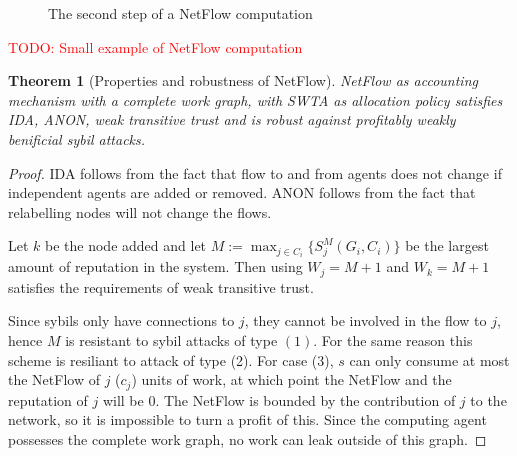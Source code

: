 \documentclass[a4paper,11pt]{book}
\newcommand\musthave[1]{\textcolor{red}{TODO: #1}}
\newtheorem{theorem}{Theorem}
\theoremstyle{definition}
\begin{document}
\begin{figure}[h]
    \centering
     \caption{The second step of a NetFlow computation}
     \label{fig:ex_nf_2}
\end{figure}


\musthave{Small example of NetFlow computation}


\begin{theorem}[Properties and robustness of NetFlow]
    NetFlow as accounting mechanism with a complete work graph, with SWTA as allocation policy
    satisfies IDA, ANON, weak transitive trust and is robust against
    profitably weakly benificial sybil attacks.

    \label{thm:prop-rob-NetFlow}
\end{theorem}


\begin{proof}
    IDA follows from the fact that flow to and from agents does not change if independent agents
    are added or removed. ANON follows from the fact that relabelling nodes will not change the flows.

    Let $k$ be the node added and let 
    $M := \max_{j \in C_i}\{S^M_j(G_i, C_i)\}$ be the largest amount of reputation in the system.
    Then using $W_j = M+1$ and $W_k = M+1$ satisfies the requirements of weak transitive trust.

    Since sybils only have connections to $j$, they cannot be involved in the flow to $j$, hence
    $M$ is resistant to sybil attacks of type $(1)$. For the same reason this scheme is resiliant
    to attack of type (2). For case (3), $s$ can only consume at most the NetFlow of $j$ ($c_j$)
    units of work, at which point the NetFlow and the reputation of $j$ will be $0$. The NetFlow
    is bounded by the contribution of $j$ to the network, so it is impossible to turn a profit of this.
    Since the computing agent possesses the complete work graph, no work can leak outside of this graph.
\end{proof}
\end{document}
